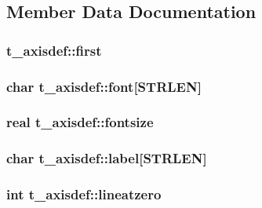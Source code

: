 \subsection{\-Member \-Data \-Documentation}
\hypertarget{structt__axisdef_ad162e619a22a92094d3ce942f768c257}{
\subsubsection[{first}]{ {\bf t\-\_\-axisdef\-::first}}}\label{structt__axisdef_ad162e619a22a92094d3ce942f768c257}
\hypertarget{structt__axisdef_ada2bb5475efb0d7459834d5e14345aac}{
\subsubsection[{font}]{\setlength{\rightskip}{0pt plus 5cm}char {\bf t\-\_\-axisdef\-::font}\mbox{[}{\bf \-S\-T\-R\-L\-E\-N}\mbox{]}}}\label{structt__axisdef_ada2bb5475efb0d7459834d5e14345aac}
\hypertarget{structt__axisdef_a0be490bcaaba018f1c93169d01c9d61e}{
\subsubsection[{fontsize}]{\setlength{\rightskip}{0pt plus 5cm}real {\bf t\-\_\-axisdef\-::fontsize}}}\label{structt__axisdef_a0be490bcaaba018f1c93169d01c9d61e}
\hypertarget{structt__axisdef_a3ce95a987b8ed51f0225817361493412}{
\subsubsection[{label}]{\setlength{\rightskip}{0pt plus 5cm}char {\bf t\-\_\-axisdef\-::label}\mbox{[}{\bf \-S\-T\-R\-L\-E\-N}\mbox{]}}}\label{structt__axisdef_a3ce95a987b8ed51f0225817361493412}
\hypertarget{structt__axisdef_a88d865f606b2d3ba315fa58d9a700888}{
\subsubsection[{lineatzero}]{\setlength{\rightskip}{0pt plus 5cm}int {\bf t\-\_\-axisdef\-::lineatzero}}}\label{structt__axisdef_a88d865f606b2d3ba315fa58d9a700888}
